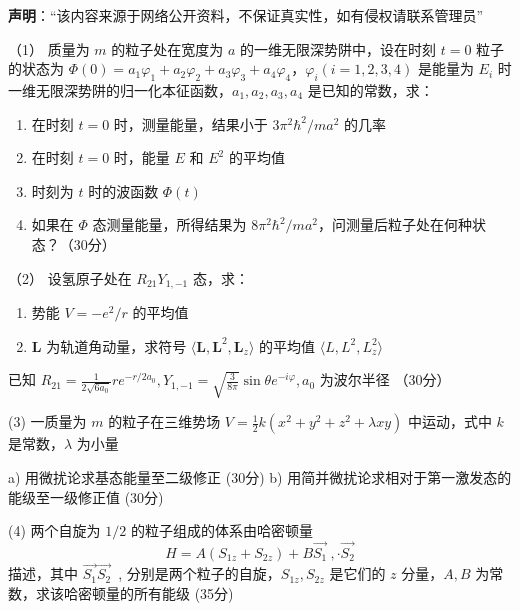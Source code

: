 
\textbf{声明}：“该内容来源于网络公开资料，不保证真实性，如有侵权请联系管理员”


（1） 质量为 $m$ 的粒子处在宽度为 $a$ 的一维无限深势阱中，设在时刻 $t=0$ 粒子的状态为 $\Phi(0) = a_1 \varphi_1 + a_2 \varphi_2 + a_3 \varphi_3 + a_4 \varphi_4$，$\varphi_i (i=1,2,3,4)$ 是能量为 $E_i$ 时一维无限深势阱的归一化本征函数，$a_1, a_2, a_3, a_4$ 是已知的常数，求：

   \begin{enumerate}
     \item 在时刻 $t=0$ 时，测量能量，结果小于 $3 \pi^2 \hbar^2 / ma^2$ 的几率
     \item 在时刻 $t=0$ 时，能量 $E$ 和 $E^2$ 的平均值
     \item 时刻为 $t$ 时的波函数 $\Phi(t)$
     \item 如果在 $\Phi$ 态测量能量，所得结果为 $8 \pi^2 \hbar^2 / ma^2$，问测量后粒子处在何种状态？（30分）
    \end{enumerate}

   （2）  设氢原子处在 $R_{21} Y_{1,-1}$ 态，求：

    \begin{enumerate}
     \item  势能 $V = -e^2 / r$ 的平均值
     \item  $\mathbf{L}$ 为轨道角动量，求符号 $\langle \mathbf{L}, \mathbf{L}^2, \mathbf{L}_z \rangle$ 的平均值 $\langle L, L^2, L_z^2 \rangle$
    \end{enumerate}


已知 $R_{21} = \frac{1}{2 \sqrt{6 a_0}} r e^{-r / 2a_0}, Y_{1,-1} = \sqrt{\frac{3}{8 \pi}} \sin \theta e^{-i \varphi}, a_0$ 为波尔半径 （30分）

   (3) 一质量为 $m$ 的粒子在三维势场 $V = \frac{1}{2} k (x^2 + y^2 + z^2 + \lambda xy)$ 中运动，式中 $k$ 是常数，$\lambda$ 为小量

a) 用微扰论求基态能量至二级修正 (30分) 
b) 用简并微扰论求相对于第一激发态的能级至一级修正值 (30分)

(4) 两个自旋为 $1/2$ 的粒子组成的体系由哈密顿量 
$$H = A (S_{1z} + S_{2z}) + B \vec{S_1}~, \cdot \vec{S_2}$$
描述，其中 $\vec{S_1} \vec{S_2}$~, 分别是两个粒子的自旋，$S_{1z}, S_{2z}$ 是它们的 $z$ 分量，$A, B$ 为常数，求该哈密顿量的所有能级  (35分)


